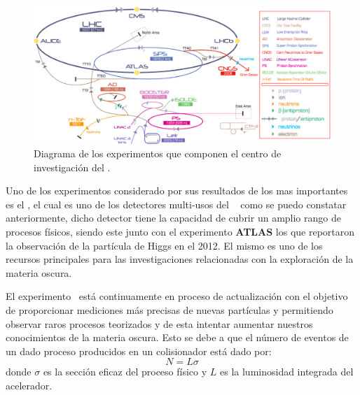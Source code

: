 \begin{itemize_f}

\end{itemize_f}

\begin{figure}[h!]
\centering
\includegraphics[width=.9\textwidth]{Analisis_y_Resultados/imagenes/cern.png}
\caption[Diagrama de los experimentos que componen el centro de investigación del \CERN.]{Diagrama de los experimentos que componen el centro de investigación del \CERN.\footnotemark}
    \label{cern}
\end{figure}

Uno de los experimentos considerado por sus resultados de los mas importantes es el \CMS, el cual es uno de los detectores multi-usos del \CERN ~ como se puedo constatar anteriormente, dicho detector tiene la capacidad de cubrir un amplio rango de procesos físicos, siendo este junto con el experimento \textbf{ATLAS} los que reportaron la observación de la partícula de Higgs en el 2012. El mismo es uno de los recursos principales para las investigaciones relacionadas con la exploración de la materia oscura.

El experimento \LHC ~está continuamente en proceso de actualización con el objetivo de proporcionar mediciones más precisas de nuevas partículas y permitiendo observar raros procesos teorizados y de esta intentar aumentar  nuestros conocimientos de la materia oscura. Esto se debe a que el número de eventos de un dado proceso producidos en un colisionador está dado por:
\begin{equation}
N = L \sigma
\end{equation}
donde $\sigma$ es la sección eficaz del proceso físico y $L$ es la luminosidad integrada del acelerador.


